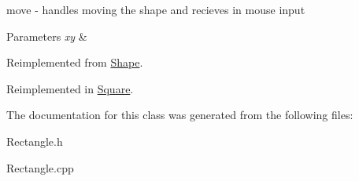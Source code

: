 move -\/ handles moving the shape and recieves in mouse input 


\begin{DoxyParams}{Parameters}
{\em xy} & \\
\hline
\end{DoxyParams}


Reimplemented from \hyperlink{class_shape_a26d57a0589b0fd7ff03a4b5ad8dc530a}{Shape}.



Reimplemented in \hyperlink{class_square_a49d1e790212e18cb43d7647385cafa20}{Square}.



The documentation for this class was generated from the following files\+:\begin{DoxyCompactItemize}
\item 
Rectangle.\+h\item 
Rectangle.\+cpp\end{DoxyCompactItemize}
